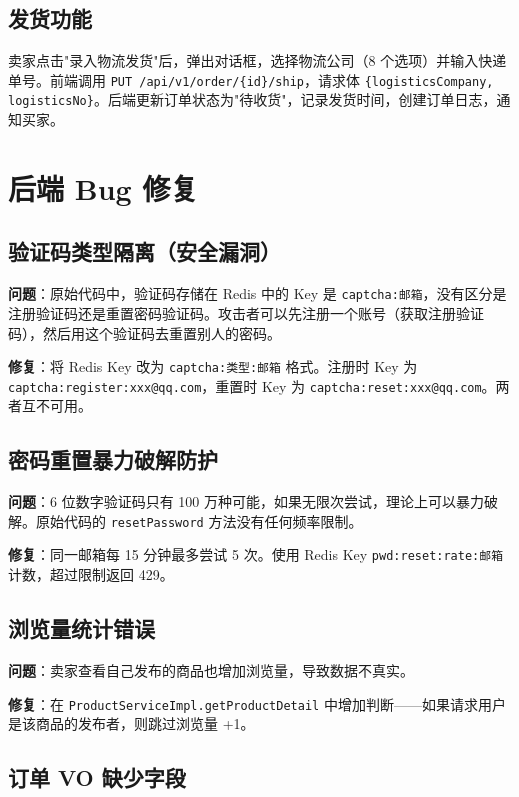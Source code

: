 \documentclass[12pt,a4paper]{ctexart}
\begin{document}
\subsection{发货功能}

卖家点击"录入物流发货"后，弹出对话框，选择物流公司（8 个选项）并输入快递单号。前端调用 \texttt{PUT /api/v1/order/\{id\}/ship}，请求体 \texttt{\{logisticsCompany, logisticsNo\}}。后端更新订单状态为"待收货"，记录发货时间，创建订单日志，通知买家。

\section{后端 Bug 修复}

\subsection{验证码类型隔离（安全漏洞）}

\textbf{问题}：原始代码中，验证码存储在 Redis 中的 Key 是 \texttt{captcha:邮箱}，没有区分是注册验证码还是重置密码验证码。攻击者可以先注册一个账号（获取注册验证码），然后用这个验证码去重置别人的密码。

\textbf{修复}：将 Redis Key 改为 \texttt{captcha:类型:邮箱} 格式。注册时 Key 为 \texttt{captcha:register:xxx@qq.com}，重置时 Key 为 \texttt{captcha:reset:xxx@qq.com}。两者互不可用。

\subsection{密码重置暴力破解防护}

\textbf{问题}：6 位数字验证码只有 100 万种可能，如果无限次尝试，理论上可以暴力破解。原始代码的 \texttt{resetPassword} 方法没有任何频率限制。

\textbf{修复}：同一邮箱每 15 分钟最多尝试 5 次。使用 Redis Key \texttt{pwd:reset:rate:邮箱} 计数，超过限制返回 429。

\subsection{浏览量统计错误}

\textbf{问题}：卖家查看自己发布的商品也增加浏览量，导致数据不真实。

\textbf{修复}：在 \texttt{ProductServiceImpl.getProductDetail} 中增加判断——如果请求用户是该商品的发布者，则跳过浏览量 +1。

\subsection{订单 VO 缺少字段}
\end{document}
